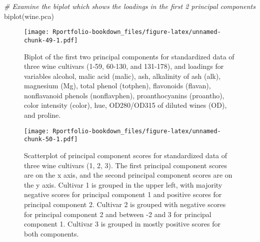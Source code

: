 \documentclass[
]{book}
\newenvironment{Shaded}{\begin{snugshade}}{\end{snugshade}}
\newcommand{\AttributeTok}[1]{\textcolor[rgb]{0.77,0.63,0.00}{#1}}
\newcommand{\CommentTok}[1]{\textcolor[rgb]{0.56,0.35,0.01}{\textit{#1}}}
\newcommand{\DecValTok}[1]{\textcolor[rgb]{0.00,0.00,0.81}{#1}}
\newcommand{\FloatTok}[1]{\textcolor[rgb]{0.00,0.00,0.81}{#1}}
\newcommand{\FunctionTok}[1]{\textcolor[rgb]{0.00,0.00,0.00}{#1}}
\newcommand{\NormalTok}[1]{#1}
\newcommand{\SpecialCharTok}[1]{\textcolor[rgb]{0.00,0.00,0.00}{#1}}
\newcommand{\StringTok}[1]{\textcolor[rgb]{0.31,0.60,0.02}{#1}}
\begin{document}
\begin{Shaded}
\begin{Highlighting}[]
\CommentTok{\# Examine the biplot which shows the loadings in the first 2 principal components}
\FunctionTok{biplot}\NormalTok{(wine.pca)}
\end{Highlighting}
\end{Shaded}

\begin{figure}
\centering
\texttt{[image: Rportfolio-bookdown\_files/figure-latex/unnamed-chunk-49-1.pdf]}
\caption{\label{fig:unnamed-chunk-49}Biplot of the first two principal components for standardized data of three wine cultivars (1-59, 60-130, and 131-178), and loadings for variables alcohol, malic acid (malic), ash, alkalinity of ash (alk), magnesium (Mg), total phenol (totphen), flavonoids (flavan), nonflavanoid phenols (nonflavphen), proanthocyanins (proantho), color intensity (color), hue, OD280/OD315 of diluted wines (OD), and proline.}
\end{figure}

\begin{Shaded}
\end{Shaded}

\begin{Shaded}
\end{Shaded}

\begin{figure}
\centering
\texttt{[image: Rportfolio-bookdown\_files/figure-latex/unnamed-chunk-50-1.pdf]}
\caption{\label{fig:unnamed-chunk-50}Scatterplot of principal component scores for standardized data of three wine cultivars (1, 2, 3). The first principal component scores are on the x axis, and the second principal component scores are on the y axis. Cultivar 1 is grouped in the upper left, with majority negative scores for principal component 1 and positive scores for principal component 2. Cultivar 2 is grouped with negative scores for principal component 2 and between -2 and 3 for principal component 1. Cultivar 3 is grouped in mostly positive scores for both components.}
\end{figure}
\end{document}
